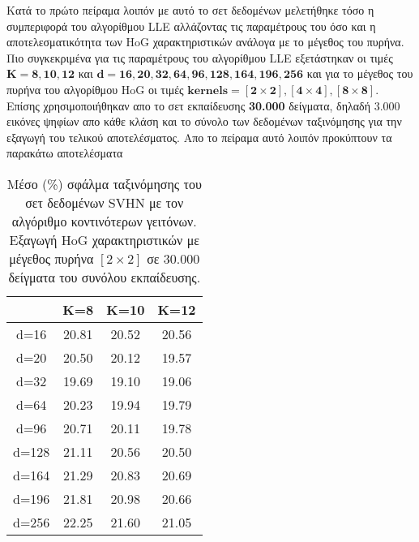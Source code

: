 \par
Κατά το πρώτο πείραμα λοιπόν με αυτό το σετ δεδομένων μελετήθηκε τόσο η συμπεριφορά του αλγορίθμου \textlatin{LLE} αλλάζοντας τις παραμέτρους του όσο και η αποτελεσματικότητα των \textlatin{HoG}\textlatin{\cite{hog}} χαρακτηριστικών ανάλογα με το μέγεθος του πυρήνα. Πιο συγκεκριμένα για τις παραμέτρους του αλγορίθμου \textlatin{LLE} εξετάστηκαν οι τιμές $\mathbf{Κ=8,10,12}$ και $\mathbf{d=16,20,32,64,96,128,164,196,256}$ και για το μέγεθος του πυρήνα του αλγορίθμου \textlatin{HoG}\textlatin{\cite{hog}} οι τιμές $\mathbf{kernels=[2\times2],[4\times4],[8\times8]}$. Επίσης χρησιμοποιήθηκαν απο το σετ εκπαίδευσης \textbf{30.000} δείγματα, δηλαδή 3.000 εικόνες ψηφίων απο κάθε κλάση και το σύνολο των δεδομένων ταξινόμησης για την εξαγωγή του τελικού αποτελέσματος. Απο το πείραμα αυτό λοιπόν προκύπτουν τα παρακάτω αποτελέσματα

\begin{table}[H]
\singlespacing
\centering
\label{tab:table11}
\caption{Μέσο (\%) σφάλμα ταξινόμησης του σετ δεδομένων \textlatin{SVHN} με τον αλγόριθμο κοντινότερων γειτόνων. Εξαγωγή \textlatin{HoG} χαρακτηριστικών με μέγεθος πυρήνα $[2\times2]$ σε 30.000 δείγματα του συνόλου εκπαίδευσης. }
\vspace*{5mm}
\begin{tabular}{|c|c|c|c|}
\hline
 & K=8 & K=10 & K=12 \\
\hline
d=16 & 20.81 & 20.52 & 20.56 \\
d=20 & 20.50 & 20.12 & 19.57 \\
d=32 & 19.69 & 19.10 & 19.06 \\
d=64 & 20.23 & 19.94 & 19.79 \\
d=96 & 20.71 & 20.11 & 19.78 \\
d=128 & 21.11 & 20.56 & 20.50 \\
d=164 & 21.29 & 20.83 & 20.69 \\
d=196 & 21.81 & 20.98 & 20.66 \\
d=256 & 22.25 & 21.60 & 21.05 \\
\hline
\end{tabular}
\end{table}

